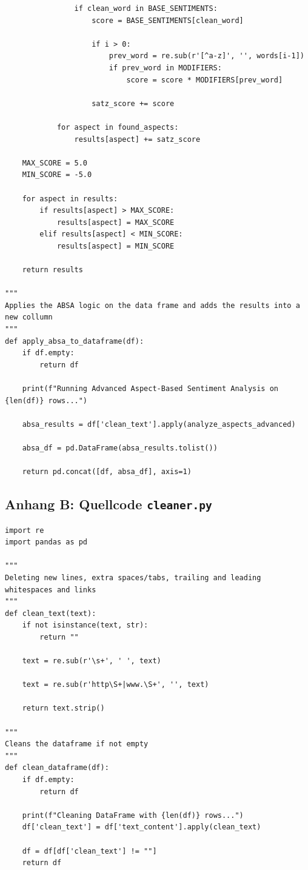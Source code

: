 \documentclass[12pt]{article}
\begin{document}
\begin{lstlisting}
                if clean_word in BASE_SENTIMENTS:
                    score = BASE_SENTIMENTS[clean_word]
                    
                    if i > 0:
                        prev_word = re.sub(r'[^a-z]', '', words[i-1])
                        if prev_word in MODIFIERS:
                            score = score * MODIFIERS[prev_word]
                    
                    satz_score += score
            
            for aspect in found_aspects:
                results[aspect] += satz_score
                
    MAX_SCORE = 5.0
    MIN_SCORE = -5.0
    
    for aspect in results:
        if results[aspect] > MAX_SCORE:
            results[aspect] = MAX_SCORE
        elif results[aspect] < MIN_SCORE:
            results[aspect] = MIN_SCORE
            
    return results

"""
Applies the ABSA logic on the data frame and adds the results into a new collumn
"""
def apply_absa_to_dataframe(df):
    if df.empty:
        return df
        
    print(f"Running Advanced Aspect-Based Sentiment Analysis on {len(df)} rows...")
    
    absa_results = df['clean_text'].apply(analyze_aspects_advanced)
    
    absa_df = pd.DataFrame(absa_results.tolist())
    
    return pd.concat([df, absa_df], axis=1)
\end{lstlisting}

\newpage
\subsection*{Anhang B: Quellcode \texttt{cleaner.py}}
\label{app:cleaner}
\begin{lstlisting}
import re
import pandas as pd

"""
Deleting new lines, extra spaces/tabs, trailing and leading whitespaces and links
"""
def clean_text(text):
    if not isinstance(text, str):
        return ""
    
    text = re.sub(r'\s+', ' ', text)
    
    text = re.sub(r'http\S+|www.\S+', '', text)
    
    return text.strip()

"""
Cleans the dataframe if not empty
"""
def clean_dataframe(df):
    if df.empty:
        return df
        
    print(f"Cleaning DataFrame with {len(df)} rows...")
    df['clean_text'] = df['text_content'].apply(clean_text)
    
    df = df[df['clean_text'] != ""]
    return df
\end{lstlisting}
\end{document}
